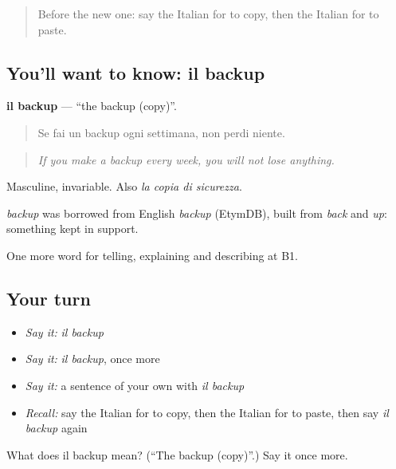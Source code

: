 \label{lesson:IT-C401-backup}



\begin{quote}
Before the new one: say the Italian for to copy, then the Italian for to paste.
\end{quote}

\subsection*{You'll want to know: il backup}
\textbf{il backup} — \textquotedblleft{}the backup (copy)\textquotedblright{}.

\begin{quote}
Se fai un backup ogni settimana, non perdi niente.
\end{quote}

\begin{quote}
\emph{If you make a backup every week, you will not lose anything.}
\end{quote}

Masculine, invariable. Also \emph{la copia di sicurezza}.

\begin{cousinweb}
\emph{backup} was borrowed from English \emph{backup} (EtymDB), built from \emph{back} and \emph{up}: something kept in support.
\end{cousinweb}

\begin{grammarlens}[title={What you've built}]
One more word for telling, explaining and describing at B1.
\end{grammarlens}

\subsection*{Your turn}
\begin{itemize}
\raggedright
  \item \emph{Say it:} \emph{il backup}
  \item \emph{Say it:} \emph{il backup}, once more
  \item \emph{Say it:} a sentence of your own with \emph{il backup}
  \item \emph{Recall:} say the Italian for to copy, then the Italian for to paste, then say \emph{il backup} again
\end{itemize}

\begin{tcolorbox}[breakable,colback=teal!4,colframe=teal!35!black,title={Before you move on}]
What does il backup mean? (\textquotedblleft{}The backup (copy)\textquotedblright{}.) Say it once more.
\end{tcolorbox}
